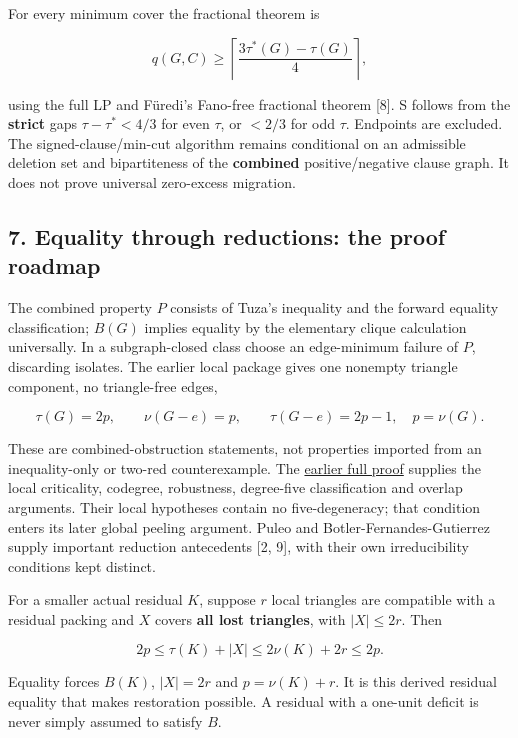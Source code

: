 \documentclass[11pt,a4paper]{article}
\begin{document}
For every minimum cover the fractional theorem is

\[q(G,C)\ge\left\lceil\frac{3\tau^*(G)-\tau(G)}4\right\rceil,\]

using the full LP and Füredi's Fano-free fractional theorem {[}8{]}. S follows from the \textbf{strict} gaps \(\tau-\tau^*<4/3\) for even \(\tau\), or \(<2/3\) for odd \(\tau\). Endpoints are excluded. The signed-clause/min-cut algorithm remains conditional on an admissible deletion set and bipartiteness of the \textbf{combined} positive/negative clause graph. It does not prove universal zero-excess migration.

\subsection{7. Equality through reductions: the proof roadmap}\label{equality-through-reductions-the-proof-roadmap}

The combined property \(P\) consists of Tuza's inequality and the forward equality classification; \(B(G)\) implies equality by the elementary clique calculation universally. In a subgraph-closed class choose an edge-minimum failure of \(P\), discarding isolates. The earlier local package gives one nonempty triangle component, no triangle-free edges,

\[\tau(G)=2p,\qquad \nu(G-e)=p,\qquad \tau(G-e)=2p-1,
\quad p=\nu(G).\]

These are combined-obstruction statements, not properties imported from an inequality-only or two-red counterexample. The \href{https://github.com/pappa211/ai-math-experiments/blob/main/papers/tuza-five-degenerate/main.md}{earlier full proof} supplies the local criticality, codegree, robustness, degree-five classification and overlap arguments. Their local hypotheses contain no five-degeneracy; that condition enters its later global peeling argument. Puleo and Botler-Fernandes-Gutierrez supply important reduction antecedents {[}2, 9{]}, with their own irreducibility conditions kept distinct.

For a smaller actual residual \(K\), suppose \(r\) local triangles are compatible with a residual packing and \(X\) covers \textbf{all lost triangles}, with \(|X|\le2r\). Then

\[2p\le\tau(K)+|X|\le2\nu(K)+2r\le2p.\]

Equality forces \(B(K)\), \(|X|=2r\) and \(p=\nu(K)+r\). It is this derived residual equality that makes restoration possible. A residual with a one-unit deficit is never simply assumed to satisfy \(B\).
\end{document}
